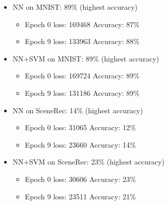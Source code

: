 \begin{enumerate}
	      \begin{itemize}
		      \item NN on MNIST: 89\% (highest accuracy)
		            \begin{itemize}
			            \item Epoch 0 loss: 169468     Accuracy: 87\%
			            \item Epoch 9 loss: 133963     Accuracy: 88\%
		            \end{itemize}
		      \item NN+SVM on MNIST: 89\% (highest accuracy)
		            \begin{itemize}
			            \item Epoch 0 loss: 169724     Accuracy: 89\%
			            \item Epoch 9 loss: 131186     Accuracy: 89\%
		            \end{itemize}
		      \item NN on SceneRec: 14\% (highest accuracy)
		            \begin{itemize}
			            \item Epoch 0 loss: 31065     Accuracy: 12\%
			            \item Epoch 9 loss: 23660     Accuracy: 14\%
		            \end{itemize}
		      \item NN+SVM on SceneRec: 23\% (highest accuracy)
		            \begin{itemize}
			            \item Epoch 0 loss: 30606     Accuracy: 23\%
			            \item Epoch 9 loss: 23511     Accuracy: 21\%
		            \end{itemize}
	      \end{itemize}

\end{enumerate}


